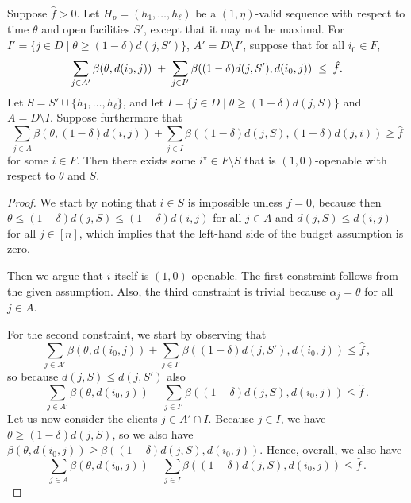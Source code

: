 \begin{lemma}
\label{lem:pay-to-open-1}
Suppose $\hat f > 0$.
Let $H_p = (h_1, \ldots, h_\ell)$ be a $(1,\eta)$-valid sequence with respect to time $\theta$ and open facilities $S'$, except that it may not be maximal.
For $I' = \{j \in D \mid \theta \geq (1-\delta) d(j, S')\}$, $A' = D \setminus I'$, suppose that for all $i_0 \in F$,
    \[\sum_{j\in A'}\beta(\theta,d(i_0,j))
\;+\;
\sum_{j\in I'}\beta((1-\delta)  d(j,S'), d(i_0,j))
\;\le\; \hat f.\]
Let $S = S' \cup \{h_1, \ldots, h_{\ell}\}$, and let $I = \{j \in D \mid \theta \geq (1-\delta) d(j, S)\}$ and $A = D \setminus I$.
Suppose furthermore that
\[\sum_{j \in A} \beta(\theta, (1-\delta) d(i, j)) + \sum_{j \in I}\beta((1-\delta)d(j,S), (1-\delta)d(j, i)) \geq \hat{f}\]
for some $i \in F$. Then there exists some $i^\star \in F \setminus S$ that is $(1,0)$-openable with respect to $\theta$ and $S$.
\end{lemma}
\begin{proof}
We start by noting that $i \in S$ is impossible unless $f=0$, because then $\theta \leq (1-\delta) d(j,S) \leq (1-\delta)d(i,j)$ for all $j \in A$ and $d(j, S) \leq d(i,j)$ for all $j \in [n]$,  which implies that the left-hand side of the budget assumption is zero.

Then we argue that $i$ itself is $(1, 0)$-openable.
The first constraint follows from the given assumption.
Also, the third constraint is trivial because $\alpha_j = \theta$ for all $j \in A$.

For the second constraint, we start by observing that
\[\sum_{j \in A'} \beta(\theta, d(i_0, j)) + \sum_{j \in I'}\beta((1-\delta)d(j,S'), d(i_0, j)) \leq \hat{f}\,,\]
so because $d(j,S) \leq d(j, S')$ also 
\[\sum_{j \in A'} \beta(\theta, d(i_0, j)) + \sum_{j \in I'}\beta((1-\delta)d(j,S), d(i_0, j)) \leq \hat{f}\,.\]
Let us now consider the clients $j \in A' \cap I$.
Because $j \in I$, we have $\theta \geq (1-\delta) d(j,S)$, so we also have $\beta(\theta, d(i_0, j)) \geq \beta((1-\delta)d(j,S), d(i_0, j))$. 
Hence, overall, we also have
\[\sum_{j \in A} \beta(\theta, d(i_0, j)) + \sum_{j \in I}\beta((1-\delta)d(j,S), d(i_0, j)) \leq \hat{f}\,.\]
\end{proof}


